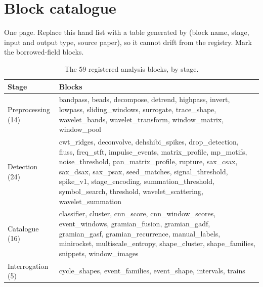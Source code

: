 \chapter{Block catalogue}
\label{app:blocks}

\begin{instructions}
One page. Replace this hand list with a table generated by  (block name, stage, input
and output type, source paper), so it cannot drift from the registry. Mark the borrowed-field blocks.
\end{instructions}

\begin{table}[htbp]
\caption[{The 59 registered analysis blocks, by stage.}]{The 59 registered analysis blocks, by stage.}
\label{tab:blocklist}
\footnotesize
\begin{tabularx}{\textwidth}{p{2.4cm} X}
\toprule
\textbf{Stage} & \textbf{Blocks}\\
\midrule
Preprocessing (14) & bandpass, beads, decompose, detrend, highpass, invert, lowpass, sliding\_windows, surrogate, trace\_shape, wavelet\_bands, wavelet\_transform, window\_matrix, window\_pool\\
\addlinespace
Detection (24) & cwt\_ridges, deconvolve, dehshibi\_spikes, drop\_detection, fluss, freq\_stft, impulse\_events, matrix\_profile, mp\_motifs, noise\_threshold, pan\_matrix\_profile, rupture, sax\_csax, sax\_dsax, sax\_psax, seed\_matches, signal\_threshold, spike\_v1, stage\_encoding, summation\_threshold, symbol\_search, threshold, wavelet\_scattering, wavelet\_summation\\
\addlinespace
Catalogue (16) & classifier, cluster, cnn\_score, cnn\_window\_scores, event\_windows, gramian\_fusion, gramian\_gadf, gramian\_gasf, gramian\_recurrence, manual\_labels, minirocket, multiscale\_entropy, shape\_cluster, shape\_families, snippets, window\_images\\
\addlinespace
Interrogation (5) & cycle\_shapes, event\_families, event\_shape, intervals, trains\\
\bottomrule
\end{tabularx}
\end{table}
